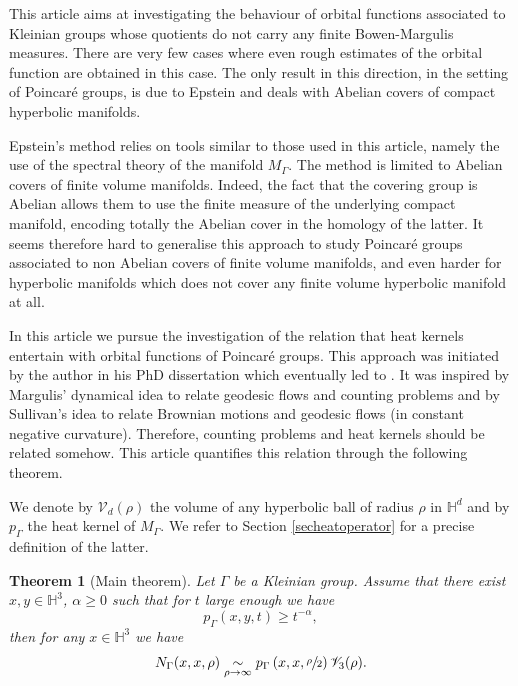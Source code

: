 \documentclass[JEP,XML,SOM,Unicode,NoFloatCountersInSection,published]{cedram}
\let\mathcal\mathscr
\theoremstyle{plain}
\newtheorem{theoreme}[equation]{Theorem}
\theoremstyle{definition}
\newcommand{\HH}{\mathbb{H}}
\newcommand{\equivaut}[1]{\underset{#1}{\sim}}
\begin{document}
This article aims at investigating the behaviour of orbital functions associated to Kleinian groups whose quotients do not carry any finite Bowen-Margulis measures. There are very few cases where even rough estimates of the orbital function are obtained in this case. The only result in this direction, in the setting of Poincaré groups, is due to Epstein \cite{articleepsteinspectraltheory1, articleepsteinspectraltheory2, articleepsteinspectraltheory3} and deals with Abelian covers of compact hyperbolic manifolds.

Epstein's method relies on tools similar to those used in this article, namely the use of the spectral theory of the manifold $M_{\Gamma}$. The method is limited to Abelian covers of finite volume manifolds. Indeed, the fact that the covering group is Abelian allows them to use the finite measure of the underlying compact manifold, encoding totally the Abelian cover in the homology of the latter. It seems therefore hard to generalise this approach to study Poincaré groups associated to non Abelian covers of finite volume manifolds, and even harder for hyperbolic manifolds which does not cover any finite volume hyperbolic manifold at all.

In this article we pursue the investigation of the relation that heat kernels entertain with orbital functions of Poincaré groups. This approach was initiated by the author in his PhD dissertation \cite{thesemoi} which eventually led to \cite{artmoiheatcounting1}. It was inspired by Margulis' dynamical idea to relate geodesic flows and counting problems and by Sullivan's idea to relate Brownian motions and geodesic flows (in constant negative curvature). Therefore, counting problems and heat kernels should be related somehow. This article quantifies this relation through the following theorem.

We denote by $\mathcal{V}_d(\rho)$ the volume of any hyperbolic ball of radius $\rho$ in $\HH^d$ and by $p_{\Gamma}$ the heat kernel of $M_{\Gamma}$. We refer to Section \ref{secheatoperator} for a precise definition of the latter.

\begin{theoreme}[Main theorem]
\label{maintheo}
Let $\Gamma$ be a Kleinian group. Assume that there exist $x,y \in \mathbb{H}^3$, $\alpha \ge 0$ such that for $t$ large enough we have
\[
p_{\Gamma}(x,y,t) \ge t^{-\alpha},
\]
then for any $x \in \HH^3$ we have
\[
N_{\Gamma}(x,x,\rho) \equivaut{\rho \to \infty} p_{\Gamma} \left(x,x,\sfrac{\rho}{2} \right) \mathcal{V}_3(\rho).
\]
\end{theoreme}
\end{document}
